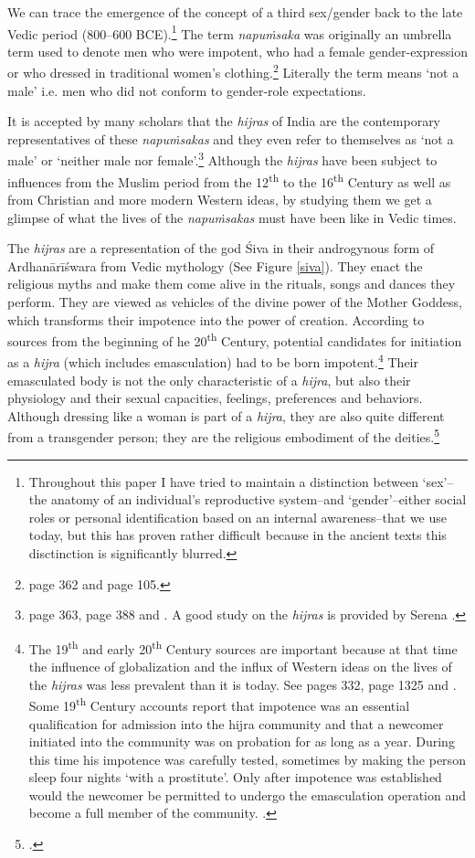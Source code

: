 We can trace the emergence of the concept of a third sex/gender back to the late Vedic period (800–600 BCE).\footnote{Throughout this paper I have tried to maintain a distinction between `sex'--the anatomy of an individual's reproductive system--and `gender'--either social roles or personal identification based on an internal awareness--that we use today, but this has proven rather difficult because in the ancient texts this disctinction is significantly blurred.} The term {\em napuṁsaka} was originally an umbrella term used to denote men who were impotent, who had a female gender-expression or who dressed in traditional women's clothing.\footnote{\cite{zwilling} page 362 and \cite{zwilling2000} page 105.} Literally the term means `not a male' i.e. men who did not conform to gender-role expectations.

It is accepted by many scholars that the {\em hijras} of India are the contemporary representatives of these {\em napuṁsakas} and they even refer to themselves as `not a male' or `neither male nor female'.\footnote{\cite{zwilling} page 363, \cite{goldman} page 388 and \cite{wendy}. A good study on the {\em hijras} is provided by Serena \cite{nanda}.} Although the {\em hijras} have been subject to influences from the Muslim period from the 12\textsuperscript{th} to the 16\textsuperscript{th} Century as well as from Christian and more modern Western ideas, by studying them we get a glimpse of what the lives of the {\em napuṁsakas} must have been like in Vedic times. 

The {\em hijras} are a representation of the god Śiva in their androgynous form of Ardhanārīśwara from Vedic mythology (See Figure \ref{siva}). They enact the religious myths and make them come alive in the rituals, songs and dances they perform. They are viewed as vehicles of the divine power of the Mother Goddess, which transforms their impotence into the power of creation. According to sources from the beginning of he 20\textsuperscript{th} Century, potential candidates for initiation as a {\em hijra} (which includes emasculation) had to be born impotent.\footnote{The 19\textsuperscript{th} and early 20\textsuperscript{th} Century sources are important because at that time the influence of globalization and the influx of Western ideas on the lives of the {\em hijras} was less prevalent than it is today. See \cite{ibbetson} pages 332, \cite{shah} page 1325 and \cite{bhimbhai}. Some 19\textsuperscript{th} Century accounts report that impotence was an essential qualification for admission into the hijra community and that a newcomer initiated into the community was on probation for as long as a year. During this time his impotence was carefully tested, sometimes by making the person sleep four nights `with a prostitute'. Only after impotence was established would the newcomer be permitted to undergo the emasculation operation and become a full member of the community. \cite{preston}.} Their emasculated body is not the only characteristic of a {\em hijra}, but also their physiology and their sexual capacities, feelings, preferences and behaviors. Although dressing like a woman is part of a {\em hijra}, they are also quite different from a transgender person; they are the religious embodiment of the deities.\footnote{\cite{nanda}.}

